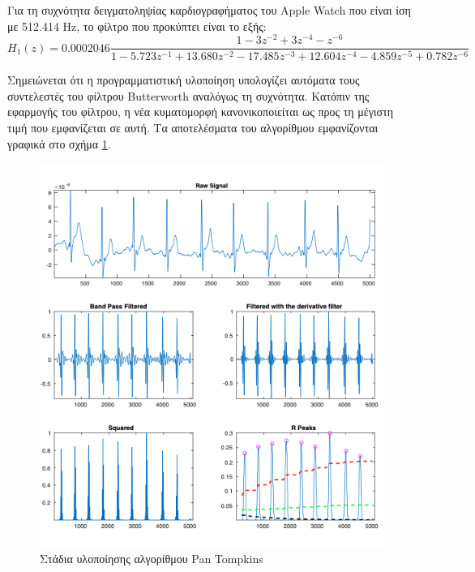 Για τη συχνότητα δειγματοληψίας καρδιογραφήματος του Apple Watch που είναι ίση με 512.414 Hz, το φίλτρο που προκύπτει είναι το εξής:
\begin{equation}
\label{eq:current_butterworth}
   H_1(z) = 0.0002046\frac{1 -3z^{-2}+3z^{-4}-z^{-6}}{1 - 5.723z^{-1} + 13.680z^{-2}-17.485z^{-3}+12.604z^{-4}-4.859z^{-5}+0.782z^{-6}}
\end{equation}

Σημειώνεται ότι η προγραμματιστική υλοποίηση υπολογίζει αυτόματα τους συντελεστές του φίλτρου 
Butterworth αναλόγως τη συχνότητα. Κατόπιν της εφαρμογής του φίλτρου, η νέα κυματομορφή κανονικοποιείται ως προς τη μέγιστη τιμή που εμφανίζεται σε αυτή. Τα αποτελέσματα του αλγορίθμου εμφανίζονται γραφικά στο σχήμα \ref{fig:pan_tompkins_graph}.

\begin{figure}[h]
    \centering
    \includegraphics[scale=0.7]{latex_code/Figures_new/graph.png}
    \caption{Στάδια υλοποίησης αλγορίθμου Pan Tompkins}
    \label{fig:pan_tompkins_graph}
\end{figure}

